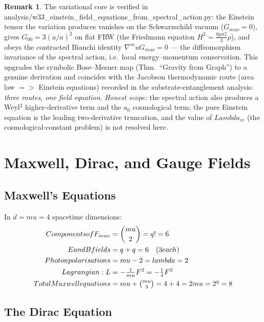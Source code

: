 \documentclass[12pt,a4paper]{article}
\def\mathrm#1{#1}%
\def\mathcal#1{#1}%
\def\texttt#1{#1}%
\def\text#1{#1}%
\def\lambda{lambda}%
\def\Lambda{Lambda}%
\def\mu{mu}%
\def\pi{pi}%
\def\Rightarrow{ => }%
\theoremstyle{definition}
\newtheorem{remark}[theorem]{Remark}
\begin{document}
\begin{remark}
The variational core is verified in
\texttt{analysis/w33\_einstein\_field\_equations\_from\_spectral\_action.py}: the
Einstein tensor the variation produces vanishes on the Schwarzschild vacuum
($G_{\mu\nu}=0$), gives $G_{00}=3(\dot a/a)^2$ on flat FRW (the Friedmann
equation $H^2=\tfrac{8\pi G}{3}\rho$), and obeys the contracted Bianchi identity
$\nabla^\mu G_{\mu\nu}=0$ --- the diffeomorphism invariance of the spectral
action, i.e.\ local energy--momentum conservation. This upgrades the symbolic
Bose--Mesner map (Thm.~``Gravity from Graph'') to a genuine derivation and
coincides with the Jacobson thermodynamic route (area law $\Rightarrow$ Einstein
equations) recorded in the substrate-entanglement analysis: \emph{three routes,
one field equation}. \emph{Honest scope:} the spectral action also produces a
Weyl$^2$ higher-derivative term and the $a_0$ cosmological term; the pure
Einstein equation is the leading two-derivative truncation, and the value of
$\Lambda_{\mathrm{cc}}$ (the cosmological-constant problem) is not resolved here.
\end{remark}


\section{Maxwell, Dirac, and Gauge Fields}
\label{sec:fields}

\subsection{Maxwell's Equations}

In $d=\mu=4$ spacetime dimensions:
\begin{align}
\text{Components of }F_{\mu\nu} &= \binom{\mu}{2} = q! = 6 \\
\text{E and B fields} &= q + q = 6 \quad(3\text{ each}) \\
\text{Photon polarisations} &= \mu-2 = \lambda = 2 \\
\text{Lagrangian: } \mathcal{L} &= -\tfrac{1}{\mu}F^2 = -\tfrac{1}{4}F^2 \\
\text{Total Maxwell equations} &= \mu + \tbinom{\mu}{3} = 4+4 = 2\mu = 2^q = 8
\end{align}

\subsection{The Dirac Equation}
\end{document}

